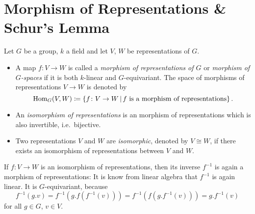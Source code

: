 \section{Morphism of Representations \& Schur’s Lemma}


\begin{definition}
Let $G$ be a group, $k$ a field and let $V$, $W$ be representations of $G$.
\begin{itemize}
  \item
    A map $f \colon V \to W$ is called a \emph{morphism of representations of $G$} or \emph{morphism of $G$-spaces} if it is both $k$-linear and $G$-equivariant.
    The space of morphisms of representations $V \to W$ is denoted by
    \[
                \Hom_G(V,W)
      \defined  \{
                  f \colon V \to W
                \suchthat
                  f \text{ is a morphism of representations}
                \} \,.
    \]
  \item
    An \emph{isomorphism of representations} is an morphism of representations which is also invertible, i.e.\ bijective.
  \item
    Two representations $V$ and $W$ are \emph{isomorphic}, denoted by $V \cong W$, if there exists an isomorphism of representations between $V$ and $W$.
\end{itemize}

\end{definition}


\begin{remark}
  If $f \colon V \to W$ is an isomorphism of representations, then its inverse $f^{-1}$ is again a morphism of representations:
  It is know from linear algebra that $f^{-1}$ is again linear.
  It is $G$-equivariant, because
  \[
      f^{-1}( g.v )
    = f^{-1}\left( g.f\left( f^{-1}( v ) \right) \right)
    = f^{-1}\left( f\left( g . f^{-1}( v ) \right) \right)
    = g.f^{-1}(v)
  \]
  for all $g \in G$, $v \in V$.
\end{remark}



